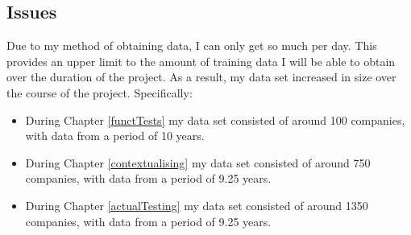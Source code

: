 \subsection{Issues}
Due to my method of obtaining data, I can only get so much per day. This provides an upper limit to the amount of training data I will be able to obtain over the duration of the project. As a result, my data set increased in size over the course of the project. Specifically:
\begin{itemize}
    \item During Chapter \ref{functTests} my data set consisted of around 100 companies, with data from a period of 10 years.
    \item During Chapter \ref{contextualising} my data set consisted of around 750 companies, with data from a period of 9.25 years.
    \item During Chapter \ref{actualTesting} my data set consisted of around 1350 companies, with data from a period of 9.25 years.
\end{itemize}